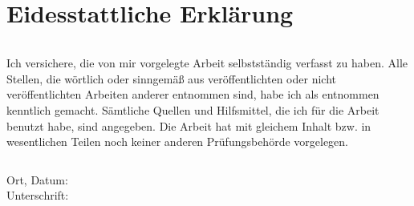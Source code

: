 \thispagestyle{empty}

\begin{verbatim}

\end{verbatim}

\section*{Eidesstattliche Erklärung}

\begin{verbatim}

\end{verbatim}

Ich versichere, die von mir vorgelegte Arbeit selbstständig verfasst zu haben. Alle Stellen, die wörtlich oder sinngemäß aus veröffentlichten oder nicht veröffentlichten Arbeiten anderer entnommen sind, habe ich als entnommen kenntlich gemacht. Sämtliche Quellen und Hilfsmittel, die ich für die Arbeit benutzt habe, sind angegeben. Die Arbeit hat mit gleichem Inhalt bzw. in wesentlichen Teilen noch keiner anderen Prüfungsbehörde vorgelegen.

\begin{verbatim}

\end{verbatim}

Ort, Datum:~~~~~~~~~~~~~~~~~~~~~~~~~~~~~~~~~~~~~~~~~~
Unterschrift:~~~~~~~~~~~~~~~~~~~~~~~~~~~~~~~~~~~~~~~~~~
